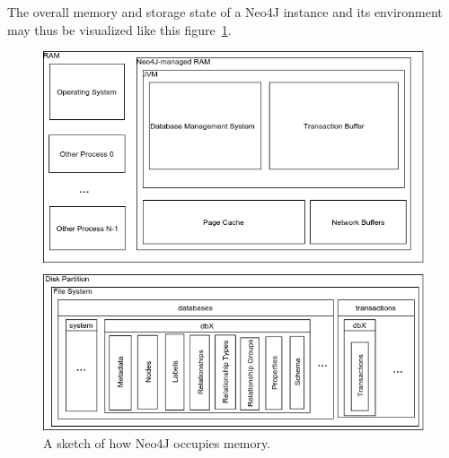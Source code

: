             The overall memory and storage state of a Neo4J instance and its environment may thus be visualized like this figure~\ref{N4J_memory_view}.

            \begin{figure}[htp]\label{N4J_memory_view}
            \begin{center}
            \includegraphics[keepaspectratio,width=\textwidth]{img/00_intro/N4J_memory_view.png}
            \end{center}
            \caption{A sketch of how Neo4J occupies memory.} %
            \end{figure}
            
